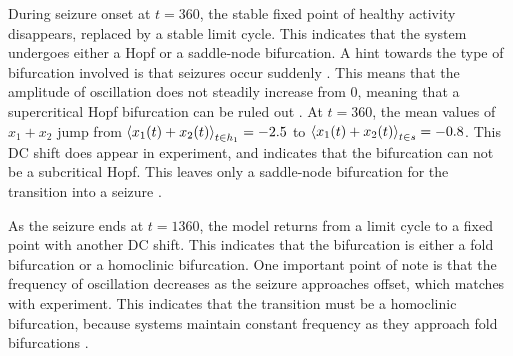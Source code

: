 During seizure onset at $t = 360$, the stable fixed point of healthy activity disappears, replaced by a stable limit cycle.
This indicates that the system undergoes either a Hopf or a saddle-node bifurcation.
A hint towards the type of bifurcation involved is that seizures occur suddenly \cite{Kandel2013}.
This means that the amplitude of oscillation does not steadily increase from 0, meaning that a supercritical Hopf bifurcation can be ruled out \cite{Strogatz2015}.
At $t = 360$, the mean values of $x_{1} + x_{2}$ jump from $\expval{x_{1}(t) + x_{2}(t)}_{t \in h_{1}} = -2.5$ to $\expval{x_{1}(t) + x_{2}(t)}_{t \in s} = -0.8$.
This DC shift does appear in experiment, and indicates that the bifurcation can not be a subcritical Hopf.
This leaves only a saddle-node bifurcation for the transition into a seizure \cite{Jirsa2014}.

As the seizure ends at $t = 1360$, the model returns from a limit cycle to a fixed point with another DC shift.
This indicates that the bifurcation is either a fold bifurcation or a homoclinic bifurcation.
One important point of note is that the frequency of oscillation decreases as the seizure approaches offset, which matches with experiment.
This indicates that the transition must be a homoclinic bifurcation, because systems maintain constant frequency as they approach fold bifurcations \cite{Jirsa2014}.
